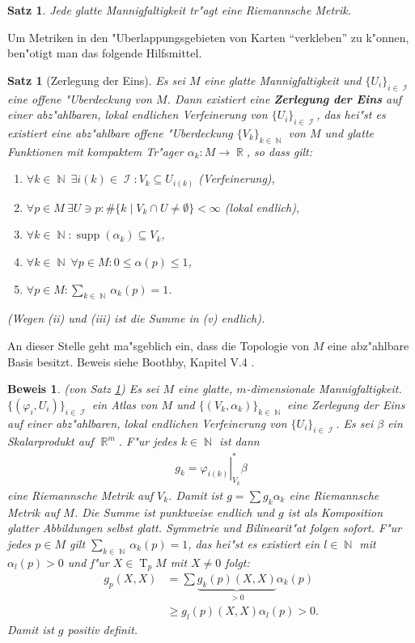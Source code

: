 \documentclass[paper=A4, twoside, chapterprefix=true, bibliography=totoc, headsepline]{scrbook}
\let\temp\phi
\let\phi\varphi
\let\varphi\temp
\let\temp\theta
\let\theta\vartheta
\let\vartheta\temp
\let\temp\epsilon
\let\epsilon\varepsilon
\let\varepsilon\temp
\let\temp\rho
\let\rho\varrho
\let\varrho\temp
\DeclareMathOperator{\N}{\mathbb{N}}
\DeclareMathOperator{\R}{\mathbb{R}}
\DeclareMathOperator{\calI}{\mathcal{I}}
\DeclareMathOperator{\supp}{supp} %
\DeclareMathOperator{\T}{T} %
\theoremstyle{plain}
\newtheorem{Satz}[Dfn]{Satz}
\theoremstyle{nonumberplain}
\newtheorem{satz}{Satz}
\newtheorem{bew}{Beweis}
\theoremstyle{empty}
\theoremstyle{break}
\newcommand{\CmIndex}[2][]{\ifthenelse{\isempty{#1}}{\index{#2}}{\index{#1}}#2}
\newcommand{\CmMark}[2][]{\textbf{\CmIndex[#1]{#2}}}
\begin{document}
\begin{Satz}\label{Satz-6-3}
  Jede glatte Mannigfaltigkeit tr"agt eine Riemannsche Metrik.
\end{Satz}

Um Metriken in den "Uberlappungsgebieten von Karten "`verkleben"' zu k"onnen, ben"otigt man das folgende Hilfsmittel.

\begin{satz}[Zerlegung der Eins]
  Es sei $M$ eine glatte Mannigfaltigkeit und $\{U_i\}_{i \in \calI}$ eine offene "Uberdeckung von $M$.
  Dann existiert eine \CmMark{Zerlegung der Eins} auf einer abz"ahlbaren, lokal endlichen Verfeinerung von $\{U_i\}_{i \in \calI}$, das hei"st es existiert eine abz"ahlbare offene "Uberdeckung $\{V_k\}_{k\in\N}$ von $M$ und glatte Funktionen mit kompaktem Tr"ager $\alpha_k \colon M \to \R$, so dass gilt:

  \begin{enumerate}[label=(\roman*)]
  \item $\forall k \in \N \ \exists i(k) \in \calI: V_k \subseteq U_{i(k)}$ (Verfeinerung),
  \item $\forall p \in M \ \exists U \ni p: \# \{k \mid V_k \cap U \neq \emptyset \} < \infty$ (lokal endlich),
  \item $\forall k \in \N: \supp (\alpha_k) \subseteq V_k$,
  \item $\forall k \in \N \ \forall p \in M: 0 \leq \alpha(p) \leq 1$,
  \item $\forall p \in M: \sum_{k\in\N}\alpha_k(p) = 1$.
  \end{enumerate}
  (Wegen (ii) und (iii) ist die Summe in (v) endlich).
\end{satz}
An dieser Stelle geht ma"sgeblich ein, dass die Topologie von $M$ eine abz"ahlbare Basis besitzt. Beweis siehe Boothby, Kapitel V.4 \cite{boothby1986introduction}.

\begin{bew}(von Satz \ref{Satz-6-3})
Es sei $M$ eine glatte, $m$-dimensionale Mannigfaltigkeit. $\{(\phi_i,U_i)\}_{i \in \calI}$ ein Atlas von $M$ und $\{(V_k,\alpha_k)\}_{k \in \N}$ eine Zerlegung der Eins auf einer abz"ahlbaren, lokal endlichen Verfeinerung von $\{U_i\}_{i \in \calI}$. Es sei $\beta$ ein Skalarprodukt auf $\R^m$. F"ur jedes $k \in \N$ ist dann
\begin{align*}
	g_k = \left.\phi_{i(k)}\right|_{V_k}^{*}\beta
\end{align*}
eine Riemannsche Metrik auf $V_k$. Damit ist $g = \sum g_k\alpha_k$ eine Riemannsche Metrik auf $M$.
Die Summe ist punktweise endlich und $g$ ist als Komposition glatter Abbildungen selbst glatt.
Symmetrie und Bilinearit"at folgen sofort.
F"ur jedes $p \in M$ gilt $\sum_{k \in \N}\alpha_k(p) = 1$, das hei"st es existiert ein $l \in \N$ mit $\alpha_l(p) > 0$ und f"ur $X \in \T_pM$ mit $X \neq 0$ folgt:
\begin{align*}
	g_p(X,X) & = \sum \underbrace{g_k(p)(X,X)}_{> 0}\alpha_k(p)\\
	& \geq g_l(p)(X,X)\alpha_l(p) > 0.
\end{align*}
Damit ist $g$ positiv definit.
\end{bew}
\end{document}
